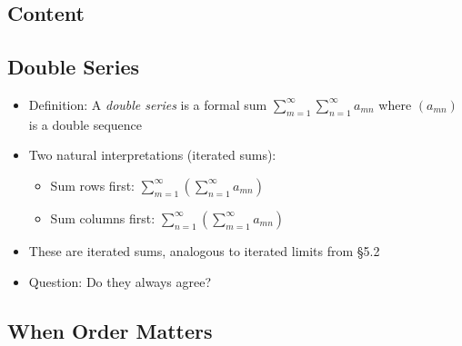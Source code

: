 \documentclass[
  10pt,
  letterpaper,
]{scrbook}
\providecommand{\tightlist}{%
  \setlength{\itemsep}{0pt}\setlength{\parskip}{0pt}}
\begin{document}
\subsection{Content}\label{content-22}

\subsection{Double Series}\label{double-series}

\begin{itemize}
\tightlist
\item
  Definition: A \emph{double series} is a formal sum
  \(\sum_{m=1}^{\infty} \sum_{n=1}^{\infty} a_{mn}\) where \((a_{mn})\)
  is a double sequence
\item
  Two natural interpretations (iterated sums):

  \begin{itemize}
  \tightlist
  \item
    Sum rows first:
    \(\sum_{m=1}^{\infty} \left( \sum_{n=1}^{\infty} a_{mn} \right)\)
  \item
    Sum columns first:
    \(\sum_{n=1}^{\infty} \left( \sum_{m=1}^{\infty} a_{mn} \right)\)
  \end{itemize}
\item
  These are iterated sums, analogous to iterated limits from §5.2
\item
  Question: Do they always agree?
\end{itemize}

\subsection{When Order Matters}\label{when-order-matters-1}
\end{document}
